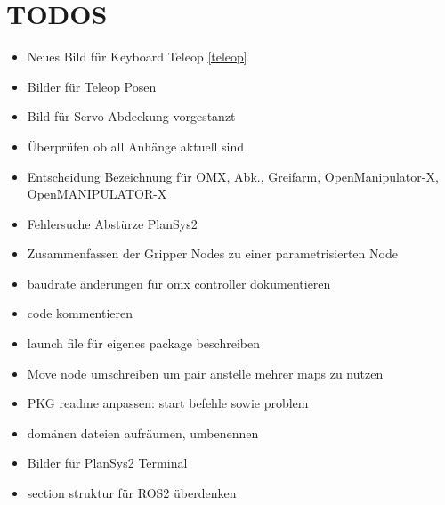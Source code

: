 \section{TODOS}
\begin{itemize}
\item Neues Bild für Keyboard Teleop \ref{teleop}
\item Bilder für Teleop Posen
\item Bild für Servo Abdeckung vorgestanzt
\item Überprüfen ob all Anhänge aktuell sind
\item Entscheidung Bezeichnung für OMX, Abk., Greifarm, OpenManipulator-X, OpenMANIPULATOR-X
\item Fehlersuche Abstürze PlanSys2
\item Zusammenfassen der Gripper Nodes zu einer parametrisierten Node
\item baudrate änderungen für omx controller dokumentieren
\item code kommentieren
\item launch file für eigenes package beschreiben
\item Move node umschreiben um pair anstelle mehrer maps zu nutzen
\item PKG readme anpassen: start befehle sowie problem
\item domänen dateien aufräumen, umbenennen
\item Bilder für PlanSys2 Terminal
\item section struktur für ROS2 überdenken
\end{itemize}